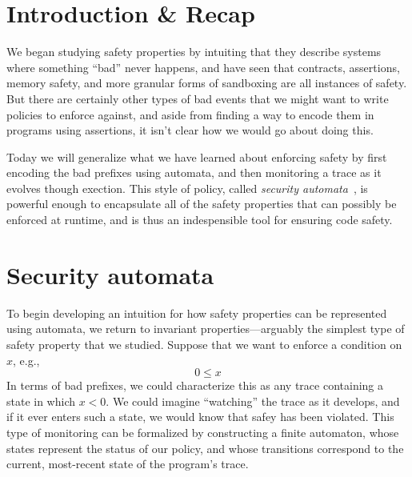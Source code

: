 \documentclass[11pt,twoside]{scrartcl}
\begin{document}
\newcommand{\atrace}{\sigma}%
\newcommand{\stdI}{\dTLint[state=\omega]}%
\newcommand{\Ip}{\dTLint[trace=\atrace]}%
\newcommand{\ws}{\omega}\newcommand{\wt}{\nu}%

\maketitle
\thispagestyle{empty}


\section{Introduction \& Recap}

We began studying safety properties by intuiting that they describe systems where something ``bad'' never happens, and have seen that contracts, assertions, memory safety, and more granular forms of sandboxing are all instances of safety.
But there are certainly other types of bad events that we might want to write policies to enforce against, and aside from finding a way to encode them in programs using assertions, it isn't clear how we would go about doing this.

Today we will generalize what we have learned about enforcing safety by first encoding the bad prefixes using automata, and then monitoring a trace as it evolves though exection.
This style of policy, called \emph{security automata}~\cite{Schneider2000}, is powerful enough to encapsulate all of the safety properties that can possibly be enforced at runtime, and is thus an indespensible tool for ensuring code safety.

\section{Security automata}

To begin developing an intuition for how safety properties can be represented using automata, we return to invariant properties---arguably the simplest type of safety property that we studied.
Suppose that we want to enforce a condition on $x$, e.g.,
\[
0 \le x
\]
In terms of bad prefixes, we could characterize this as any trace containing a state in which $x < 0$.
We could imagine ``watching'' the trace as it develops, and if it ever enters such a state, we would know that safey has been violated.
This type of monitoring can be formalized by constructing a finite automaton, whose states represent the status of our policy, and whose transitions correspond to the current, most-recent state of the program's trace.
\end{document}
